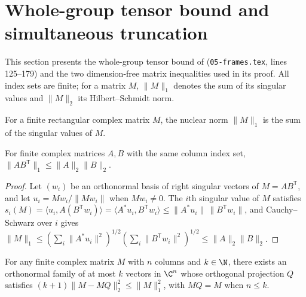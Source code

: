 \section{Whole-group tensor bound and simultaneous truncation}
\label{sec:peps_group_truncation}
This section presents the whole-group tensor bound of
\cite[Lemma~6.2]{OpenAI2026PolynomialPEPS} (\texttt{05-frames.tex},
lines 125--179) and the two dimension-free matrix inequalities used in its
proof. All index sets are finite; for a matrix $M$, $\lVert M\rVert_1$ denotes
the sum of its singular values and $\lVert M\rVert_2$ its Hilbert--Schmidt norm.

\begin{definition}
    \label{def:peps_group_nuclear_norm}
    \leanok
    For a finite rectangular complex matrix $M$, the nuclear norm
    $\lVert M\rVert_1$ is the sum of the singular values of $M$.
\end{definition}

\begin{lemma}
    \label{lem:peps_group_nuclear_holder}
    \leanok
    For finite complex matrices $A,B$ with the same column index set,
    $\lVert AB^{\mathsf T}\rVert_1\le\lVert A\rVert_2\lVert B\rVert_2$.
\end{lemma}

\begin{proof}\leanok
    Let $(w_i)$ be an orthonormal basis of right singular vectors of
    $M=AB^{\mathsf T}$, and let $u_i=Mw_i/\lVert Mw_i\rVert$ when $Mw_i\ne0$.
    The $i$th singular value of $M$ satisfies
    $s_i(M)=\langle u_i,A(B^{\mathsf T}w_i)\rangle
        =\langle A^{*}u_i,B^{\mathsf T}w_i\rangle
        \le\lVert A^{*}u_i\rVert\,\lVert B^{\mathsf T}w_i\rVert$,
    and Cauchy--Schwarz over $i$ gives
    $\lVert M\rVert_1\le(\sum_i\lVert A^{*}u_i\rVert^2)^{1/2}(\sum_i\lVert B^{\mathsf T}w_i\rVert^2)^{1/2}
        \le\lVert A\rVert_2\lVert B\rVert_2$.
\end{proof}

\begin{lemma}
    \label{lem:peps_group_orthonormal_truncation}
    \leanok
    For any finite complex matrix $M$ with $n$ columns and $k\in\N$, there
    exists an orthonormal family of at most $k$ vectors in $\C^n$ whose
    orthogonal projection $Q$ satisfies
    $(k+1)\lVert M-MQ\rVert_2^2\le\lVert M\rVert_1^2$, with $MQ=M$ when
    $n\le k$.
\end{lemma}


